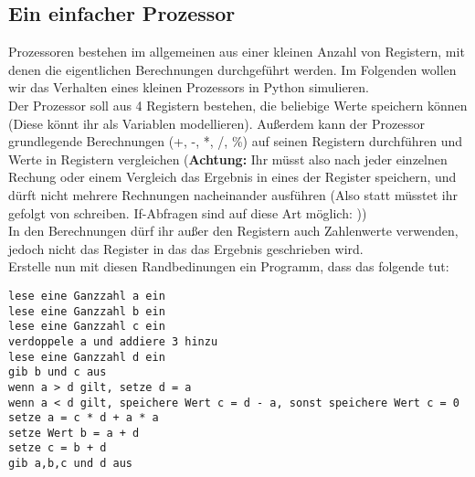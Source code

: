\subsection{Ein einfacher Prozessor}
Prozessoren bestehen im allgemeinen aus einer kleinen Anzahl von Registern, mit denen die eigentlichen Berechnungen durchgeführt werden. Im Folgenden wollen wir das Verhalten eines kleinen Prozessors in Python simulieren. \\
Der Prozessor soll aus 4 Registern bestehen, die beliebige Werte speichern können (Diese könnt ihr als Variablen modellieren). Außerdem kann der Prozessor grundlegende Berechnungen (+, -, *, /, \%) auf seinen Registern durchführen und Werte in Registern vergleichen (\textbf{Achtung:} Ihr müsst also nach jeder einzelnen Rechung oder einem Vergleich das Ergebnis in eines der Register speichern, und dürft nicht mehrere Rechnungen nacheinander ausführen (Also statt  müsstet ihr  gefolgt von  schreiben. If-Abfragen sind auf diese Art möglich: )) \\
In den Berechnungen dürf ihr außer den Registern auch Zahlenwerte verwenden, jedoch nicht das Register in das das Ergebnis geschrieben wird.\\
Erstelle nun mit diesen Randbedinungen ein Programm, dass das folgende tut: \\
\begin{lstlisting}
lese eine Ganzzahl a ein
lese eine Ganzzahl b ein
lese eine Ganzzahl c ein
verdoppele a und addiere 3 hinzu
lese eine Ganzzahl d ein
gib b und c aus
wenn a > d gilt, setze d = a
wenn a < d gilt, speichere Wert c = d - a, sonst speichere Wert c = 0
setze a = c * d + a * a
setze Wert b = a + d
setze c = b + d
gib a,b,c und d aus
\end{lstlisting}
